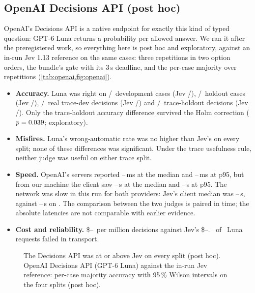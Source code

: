 \subsection{OpenAI Decisions API (post hoc)}\label{sec:openai}
OpenAI's Decisions API is a native endpoint for exactly this kind of typed question: GPT-6 Luna returns a probability per
allowed answer. We ran it after the preregistered work, so everything here is post hoc and exploratory, against an
in-run Jev 1.13 reference on the same cases: three repetitions in two option orders, the bundle's gate with its
3\,s deadline, and the per-case majority over repetitions (\cref{tab:openai,fig:openai}).
\begin{itemize}
  \item \textbf{Accuracy.} Luna was right on \OaDevLunaK/\OaDevLunaN\ development cases (Jev \OaDevJevK/\OaDevJevN),
    \OaHoldoutLunaK/\OaHoldoutLunaN\ holdout cases (Jev \OaHoldoutJevK/\OaHoldoutJevN), \OaTraceDevLunaK/\OaTraceDevLunaN\
    real trace-dev decisions (Jev \OaTraceDevJevK/\OaTraceDevJevN) and \OaTraceHoldoutLunaK/\OaTraceHoldoutLunaN\
    trace-holdout decisions (Jev \OaTraceHoldoutJevK/\OaTraceHoldoutJevN). Only the trace-holdout accuracy difference
    survived the Holm correction ($p = 0.039$; exploratory).
  \item \textbf{Misfires.} Luna's wrong-automatic rate was no higher than Jev's on every split; none of these differences
    was significant. Under the trace usefulness rule, neither judge was useful on either trace split.
  \item \textbf{Speed.} OpenAI's servers reported \OaServerPfiftyLo--\OaServerPfiftyHi\,ms at the median and
    \OaServerPninetyfiveLo--\OaServerPninetyfiveHi\,ms at p95, but from our machine the client saw
    \OaClientPfiftyLo--\OaClientPfiftyHi\,s at the median and \OaClientPninetyfiveLo--\OaClientPninetyfiveHi\,s at p95.
    The network was slow in this run for both providers: Jev's client median was \OaJevClientLo--\OaJevClientHi\,s,
    against \OaJevEarlierLo--\OaJevEarlierHi\,s on \OaJevEarlierDate. The comparison between the two judges is paired in
    time; the absolute latencies are not comparable with earlier evidence.
  \item \textbf{Cost and reliability.} \$\OaUsdLo--\OaUsdHi\ per million decisions against Jev's \$\OaJevUsdLo--\OaJevUsdHi.
    \OaInvalid\ of \OaRequests\ Luna requests failed in transport.
\end{itemize}
\begin{figure}[htbp]
\centering
{}\par\smallskip

\caption{The Decisions API was at or above Jev on every split (post hoc). OpenAI Decisions API (GPT-6 Luna) against the in-run Jev reference: per-case majority accuracy with 95\,\%
Wilson intervals on the four splits (post hoc).}
\label{fig:openai}
\end{figure}
